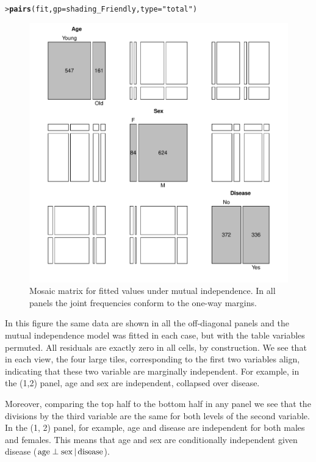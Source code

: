 \documentclass[10pt,krantz2]{krantz}\usepackage[]{graphicx}\usepackage[]{color}
\makeatletter
\newcommand{\hlstr}[1]{\textcolor[rgb]{0.192,0.494,0.8}{#1}}%
\newcommand{\hlstd}[1]{\textcolor[rgb]{0.345,0.345,0.345}{#1}}%
\newcommand{\hlkwc}[1]{\textcolor[rgb]{0.333,0.667,0.333}{#1}}%
\newcommand{\hlkwd}[1]{\textcolor[rgb]{0.737,0.353,0.396}{\textbf{#1}}}%
\newenvironment{kframe}{%
 \def\at@end@of@kframe{}%
 \ifinner\ifhmode%
  \def\at@end@of@kframe{\end{minipage}}%
  \begin{minipage}{\columnwidth}%
 \fi\fi%
 \def\FrameCommand##1{\hskip\@totalleftmargin \hskip-\fboxsep
 \colorbox{shadecolor}{##1}\hskip-\fboxsep
     \hskip-\linewidth \hskip-\@totalleftmargin \hskip\columnwidth}%
 \MakeFramed {\advance\hsize-\width
   \@totalleftmargin\z@ \linewidth\hsize
   \@setminipage}}%
 {\par\unskip\endMakeFramed%
 \at@end@of@kframe}
\newenvironment{knitrout}{}{} %
\renewenvironment{knitrout}{\small\renewcommand{\baselinestretch}{.85}}{} %
\makeatother
\begin{document}
\begin{knitrout}
\color{fgcolor}\begin{kframe}
\begin{alltt}
\hlstd{> }\hlkwd{pairs}\hlstd{(fit,} \hlkwc{gp} \hlstd{= shading_Friendly,} \hlkwc{type} \hlstd{=} \hlstr{"total"}\hlstd{)}
\end{alltt}
\end{kframe}\begin{figure}[!htb]

\centerline{\includegraphics[width=.8\textwidth]{ch05/fig/struc-mos3-1} }

\caption[Mosaic matrix for fitted values under mutual independence]{Mosaic matrix for fitted values under mutual independence.  In all panels the joint frequencies conform to the one-way margins.\label{fig:struc-mos3}}
\end{figure}


\end{knitrout}
In this figure the same data are shown in all the off-diagonal panels
and the mutual independence model was fitted in each case, but with the
table variables permuted.  All residuals are exactly zero in all cells,
by construction.
We see that in each view, the four large
tiles, corresponding to the first two variables align, indicating
that these two variable are marginally independent.
For example, in the (1,2) panel, age and sex are independent, collapsed
over disease.

Moreover, comparing the top half to the bottom half
in any panel we see that the divisions by the third variable
are the same for both levels of the second variable.
In the (1, 2) panel, for example, age and disease are independent
for both males and females.
This means that age and sex are conditionally independent
given disease ($\mathrm{age} \perp \mathrm{sex} \, | \, \mathrm{disease}$).
\end{document}
